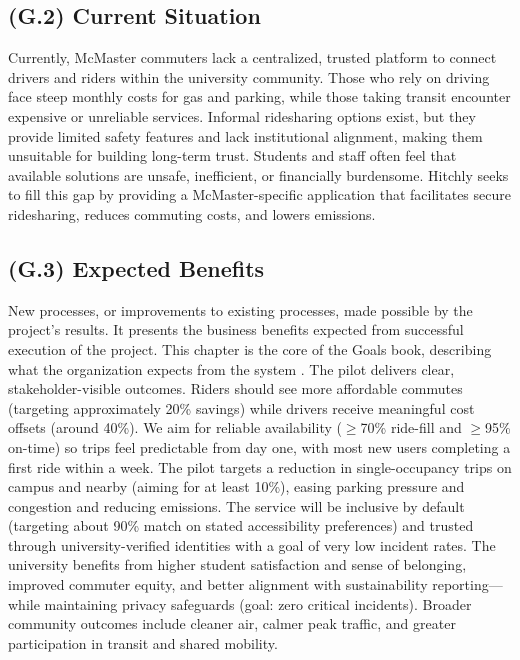 \documentclass[12pt,letterpaper]{article}
\begin{document}
\subsection{(G.2) Current Situation}
Currently, McMaster commuters lack a centralized, trusted platform to connect drivers and riders within the university community. Those who rely on driving face steep monthly costs for gas and parking, while those taking transit encounter expensive or unreliable services. Informal ridesharing options exist, but they provide limited safety features and lack institutional alignment, making them unsuitable for building long-term trust. Students and staff often feel that available solutions are unsafe, inefficient, or financially burdensome. Hitchly seeks to fill this gap by providing a McMaster-specific application that facilitates secure ridesharing, reduces commuting costs, and lowers emissions. 

\subsection{(G.3) Expected Benefits}
New processes, or improvements to existing processes, made possible by the project's results. It presents the business benefits expected from successful execution of the project. This chapter is the core of the Goals book, describing what the organization expects from the system \cite{meyer2022}.
The pilot delivers clear, stakeholder-visible outcomes. Riders should see more affordable commutes (targeting approximately 20\% savings) while drivers receive meaningful cost offsets (around 40\%). We aim for reliable availability ($\geq$70\% ride-fill and $\geq$95\% on-time) so trips feel predictable from day one, with most new users completing a first ride within a week. The pilot targets a reduction in single-occupancy trips on campus and nearby (aiming for at least 10\%), easing parking pressure and congestion and reducing emissions. The service will be inclusive by default (targeting about 90\% match on stated accessibility preferences) and trusted through university-verified identities with a goal of very low incident rates. The university benefits from higher student satisfaction and sense of belonging, improved commuter equity, and better alignment with sustainability reporting---while maintaining privacy safeguards (goal: zero critical incidents). Broader community outcomes include cleaner air, calmer peak traffic, and greater participation in transit and shared mobility.
\end{document}
